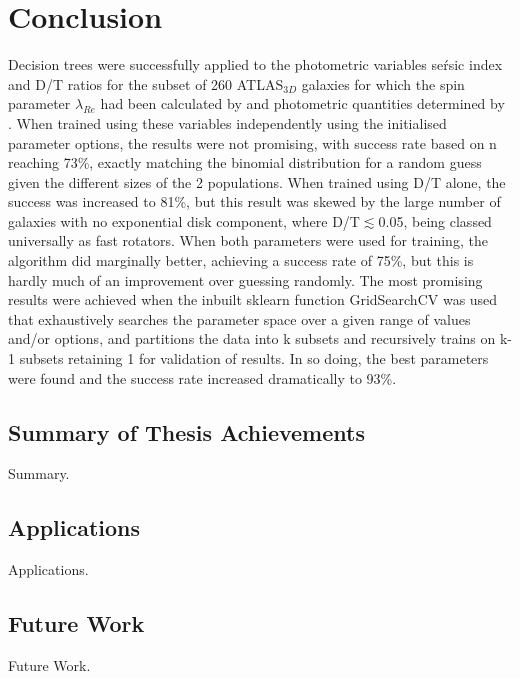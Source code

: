 
\chapter{Conclusion}

\label{ch:conclusions}
Decision trees were successfully applied to the photometric variables se\'rsic index and D/T ratios for the subset of 260 ATLAS$_{3D}$ galaxies for which the spin parameter $\lambda_{Re}$ had been calculated by \cite{Emsellem2011} and photometric quantities determined by \cite{Krajnovic2013}. When trained using these variables independently using the initialised parameter options, the results were not promising, with success rate based on n reaching 73\%, exactly matching the binomial distribution for a random guess given the different sizes of the 2 populations. When trained using D/T alone, the success was increased to 81\%, but this result was skewed by the large number of galaxies with no exponential disk component, where D/T$\lesssim $0.05, being classed universally as fast rotators. When both parameters were used for training, the algorithm did marginally better, achieving a success rate of 75\%, but this is hardly much of an improvement over guessing randomly. The most promising results were achieved when the inbuilt sklearn function GridSearchCV was used that exhaustively searches the parameter space over a given range of values and/or options, and partitions the data into k subsets and recursively trains on k-1 subsets retaining 1 for validation of results. In so doing, the best parameters were found and the success rate increased dramatically to 93\%.

\section{Summary of Thesis Achievements}

Summary.


\section{Applications}

Applications.


\section{Future Work}

Future Work.
